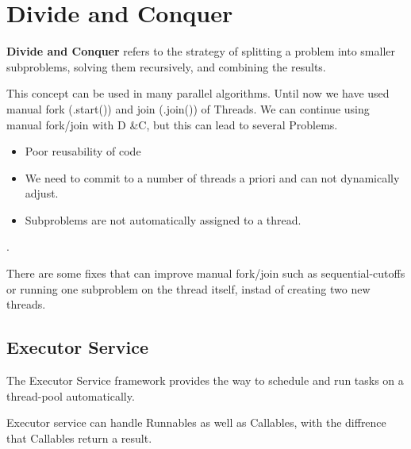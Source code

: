 \section{Divide and Conquer}

\begin{definition}

\textbf{Divide and Conquer } refers to the strategy of splitting a problem into smaller subproblems,
                solving them recursively, and combining the results.
            
\end{definition}

            This concept can be used in many parallel algorithms. Until now we have used manual fork (.start()) and join
            (.join()) of Threads. We can continue using manual fork/join with D \&C, but this can lead to several
            Problems.

            \begin{itemize}
    \item Poor reusability of code
    \item We need to commit to a number of threads a priori and can not dynamically adjust.
    \item Subproblems are not automatically assigned to a thread.
\end{itemize}
.

            \begin{remark}

                There are some fixes that can improve manual fork/join such as sequential-cutoffs or running one
                subproblem on the thread itself, instad of creating two new threads.
            
\end{remark}

\subsection{Executor Service}

            The Executor Service framework provides the way to schedule and run tasks on a thread-pool automatically.

            \begin{remark}

                Executor service can handle Runnables as well as Callables, with the diffrence that Callables return a
                result.
            
\end{remark}

